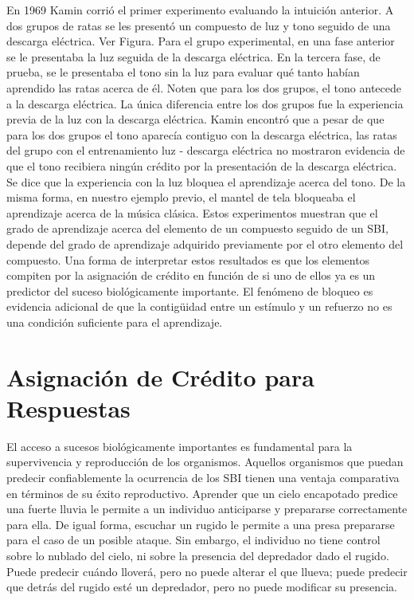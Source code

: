 \documentclass[
  letterpaper,
]{book}
\begin{document}
En 1969 Kamin corrió el primer experimento evaluando la intuición
anterior. A dos grupos de ratas se les presentó un compuesto de luz y
tono seguido de una descarga eléctrica. Ver Figura. Para el grupo
experimental, en una fase anterior se le presentaba la luz seguida de la
descarga eléctrica. En la tercera fase, de prueba, se le presentaba el
tono sin la luz para evaluar qué tanto habían aprendido las ratas acerca
de él. Noten que para los dos grupos, el tono antecede a la descarga
eléctrica. La única diferencia entre los dos grupos fue la experiencia
previa de la luz con la descarga eléctrica. Kamin encontró que a pesar
de que para los dos grupos el tono aparecía contiguo con la descarga
eléctrica, las ratas del grupo con el entrenamiento luz - descarga
eléctrica no mostraron evidencia de que el tono recibiera ningún crédito
por la presentación de la descarga eléctrica. Se dice que la experiencia
con la luz bloquea el aprendizaje acerca del tono. De la misma forma, en
nuestro ejemplo previo, el mantel de tela bloqueaba el aprendizaje
acerca de la música clásica. Estos experimentos muestran que el grado de
aprendizaje acerca del elemento de un compuesto seguido de un SBI,
depende del grado de aprendizaje adquirido previamente por el otro
elemento del compuesto. Una forma de interpretar estos resultados es que
los elementos compiten por la asignación de crédito en función de si uno
de ellos ya es un predictor del suceso biológicamente importante. El
fenómeno de bloqueo es evidencia adicional de que la contigüidad entre
un estímulo y un refuerzo no es una condición suficiente para el
aprendizaje.


\chapter{Asignación de Crédito para
Respuestas}\label{asignaciuxf3n-de-cruxe9dito-para-respuestas}

El acceso a sucesos biológicamente importantes es fundamental para la
supervivencia y reproducción de los organismos. Aquellos organismos que
puedan predecir confiablemente la ocurrencia de los SBI tienen una
ventaja comparativa en términos de su éxito reproductivo. Aprender que
un cielo encapotado predice una fuerte lluvia le permite a un individuo
anticiparse y prepararse correctamente para ella. De igual forma,
escuchar un rugido le permite a una presa prepararse para el caso de un
posible ataque. Sin embargo, el individuo no tiene control sobre lo
nublado del cielo, ni sobre la presencia del depredador dado el rugido.
Puede predecir cuándo lloverá, pero no puede alterar el que llueva;
puede predecir que detrás del rugido esté un depredador, pero no puede
modificar su presencia.
\end{document}
